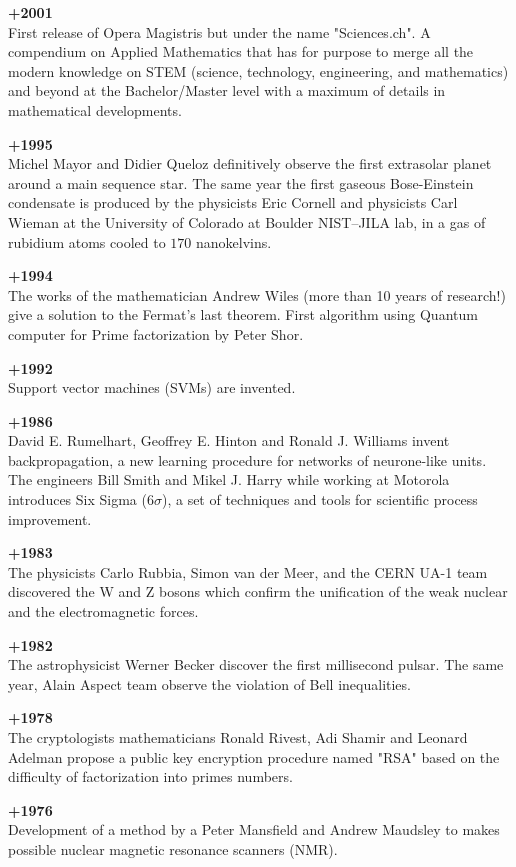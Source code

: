 \textbf{+2001}\\
First release of Opera Magistris but under the name "Sciences.ch". A compendium on Applied Mathematics that has for purpose to merge all the modern knowledge on STEM (science, technology, engineering, and mathematics) and beyond at the Bachelor/Master level with a maximum of details in mathematical developments.

\textbf{+1995}\\
Michel Mayor and Didier Queloz definitively observe the first extrasolar planet around a main sequence star. The same year the first gaseous Bose-Einstein condensate is produced by the physicists Eric Cornell and physicists Carl Wieman at the University of Colorado at Boulder NIST–JILA lab, in a gas of rubidium atoms cooled to $170$ nanokelvins.

\textbf{+1994}\\
The works of the mathematician Andrew Wiles (more than 10 years of research!) give a solution to the Fermat's last theorem. First algorithm using Quantum computer for Prime factorization by Peter Shor.

\textbf{+1992}\\
Support vector machines (SVMs) are invented.

\textbf{+1986}\\
David E. Rumelhart, Geoffrey E. Hinton and Ronald J. Williams invent backpropagation, a new learning procedure for networks of neurone-like units. The engineers Bill Smith and Mikel J. Harry while working at Motorola introduces Six Sigma ($6\sigma$), a set of techniques and tools for scientific process improvement.

\textbf{+1983}\\
The physicists Carlo Rubbia, Simon van der Meer, and the CERN UA-1 team discovered the W and Z bosons which confirm the unification of the weak nuclear and the electromagnetic forces.

\textbf{+1982}\\
The astrophysicist Werner Becker discover the first millisecond pulsar. The same year, Alain Aspect team observe the violation of Bell inequalities.

\textbf{+1978}\\
The cryptologists mathematicians Ronald Rivest, Adi Shamir and Leonard Adelman propose a public key encryption procedure named "RSA" based on the difficulty of factorization into primes numbers.

\textbf{+1976}\\
Development of a method by a Peter Mansfield and Andrew Maudsley to makes possible nuclear magnetic resonance scanners (NMR).

